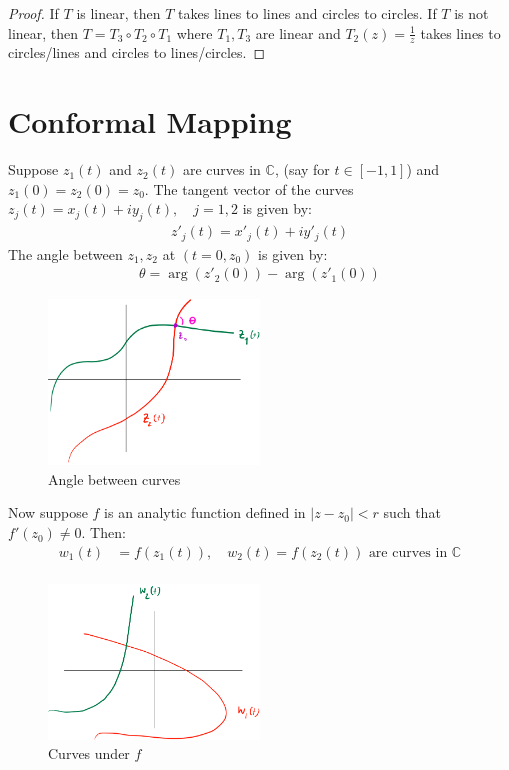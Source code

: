 \begin{proof}
    If $T$ is linear, then $T$ takes lines to lines and circles to circles. If $T$ is not linear, then $T = T_3 \circ T_2 \circ T_1$ where $T_1, T_3$ are linear and $T_2(z) = \frac{1}{z}$ takes lines to circles/lines and circles to lines/circles.
\end{proof}

\section{Conformal Mapping}

\begin{proposition}
    Suppose $z_1(t)$ and $z_2(t)$ are curves in $\mathbb{C}$, (say for $t \in [-1, 1]$) and $z_1(0) = z_2(0) = z_0$. The tangent vector of the curves $z_j(t) = x_j(t) + iy_j(t), \quad j = 1, 2$ is given by:
    \begin{align*}
        z'_j(t) = x'_j(t) + iy'_j(t)
    \end{align*}
    The angle between $z_1, z_2$ at $(t = 0, z_0)$ is given by:
    \begin{align*}
        \theta =  \arg(z'_2(0))- \arg(z'_1(0))
    \end{align*}

    \begin{figure}[H]
        \centering
        \includegraphics[width=0.5\textwidth]{LECTURE_16/graph.png}
        \caption{Angle between curves}
    \end{figure}

    Now suppose $f$ is an analytic function defined in $|z - z_0| < r$ such that $f'(z_0) \neq 0$. Then:
    \begin{align*}
        w_1(t) & = f(z_1(t)), \quad w_2(t) = f(z_2(t)) \text{ are curves in } \mathbb{C} \\
    \end{align*}

    \begin{figure}[H]
        \centering
        \includegraphics[width=0.5\textwidth]{LECTURE_16/graph2.png}
        \caption{Curves under $f$}
    \end{figure}


\end{proposition}
